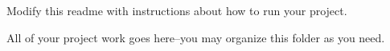 Modify this readme with instructions about how to run your project.

All of your project work goes here--you may organize this folder as you need. 